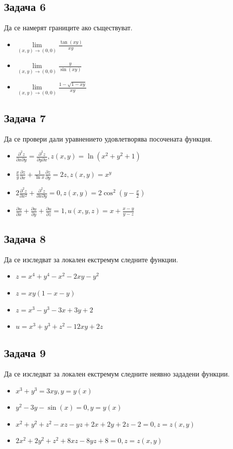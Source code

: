 \documentclass[a4paper,fleqn,12pt]{article}
\theoremstyle{definition}
\begin{document}
\subsection*{Задача 6}
Да се намерят границите ако съществуват.
\begin{itemize}
\item $\lim\limits_{(x,y) \to (0,0)} \frac{\tan(xy)}{xy}$
\item $\lim\limits_{(x,y) \to (0,0)} \frac{y}{\sin{(xy)}}$
\item $\lim\limits_{(x,y) \to (0,0)} \frac{1 - \sqrt{1 - xy}}{xy}$
\end{itemize}

\subsection*{Задача 7}
Да се провери дали уравнението удовлетворява посочената функция.
\begin{itemize}
\item $\frac{\partial^2 z}{\partial x \partial y} = \frac{\partial^2 z}{\partial y \partial x}, z(x,y) = \ln(x^2+y^2+1)$
\item $\frac{x}{y}\frac{\partial z}{\partial x} + \frac{1}{\ln x} \frac{\partial z}{\partial y } = 2z, z(x,y) =x^y$
\item $2 \frac{\partial^2 z}{\partial x^2 } + \frac{\partial^2 z}{\partial x \partial y} = 0, z(x,y) = 2\cos^2(y - \frac{x}{2})$
\item $\frac{\partial u}{\partial x} + \frac{\partial u}{\partial y} + \frac{\partial u}{\partial z} = 1, u(x,y,z) = x + \frac{x-y}{y-z}$
\end{itemize}

\subsection*{Задача 8}
Да се изследват за локален екстремум следните функции.
\begin{itemize}
\item $z = x^4 + y^4- x^2- 2xy - y^2$
\item $z = xy(1 - x - y)$
\item $z = x^3 - y^3 - 3x + 3y + 2$
\item $u = x^3 + y^3 + z^2 - 12xy + 2z$
\end{itemize}

\subsection*{Задача 9}
Да се изследват за локален екстремум следните неявно зададени функции.
\begin{itemize}
\item $x^3 + y^3 = 3xy, y = y(x)$
\item $y^2 -3y - \sin(x)= 0, y = y(x)$
\item $x^2 + y^2 + z^2 - xz -yz + 2x + 2y + 2z - 2 = 0, z = z(x,y)$
\item $2x^2 + 2y^2 + z^2 + 8xz -8yz + 8 = 0, z = z(x,y)$
\end{itemize}
\end{document}
